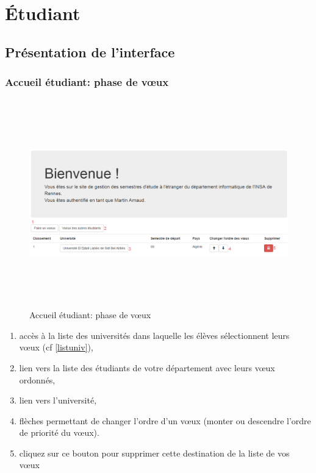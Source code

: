 \chapter{Étudiant}

\section{Présentation de l'interface}

  \subsection{Accueil étudiant: phase de vœux}
   	\label{pv}
   	\begin{figure}[H]
  	\centering
  	
  	\includegraphics[width=16cm,height=9cm]{Images/Etudiant/faire_voeux_etud.png}
  	\caption{Accueil étudiant: phase de vœux}
  \end{figure}
            
    \begin{enumerate}
       	\item accès à la liste des universités dans laquelle les élèves sélectionnent leurs vœux (cf \ref{listuniv}),
       	\item lien vers la liste des étudiants de votre département avec leurs vœux ordonnés,
       	\item lien vers l'université,
       	\item flèches permettant de changer l'ordre d'un vœux (monter ou descendre l'ordre de priorité du vœux).
       	\item cliquez sur ce bouton pour supprimer cette destination de la liste de vos vœux 
     \end{enumerate}
     
